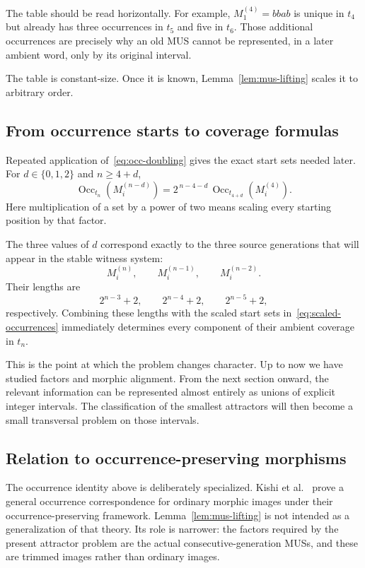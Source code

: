 \documentclass[11pt,a4paper]{article}
\theoremstyle{definition}\newtheorem{definition}[theorem]{Definition}
\theoremstyle{remark}\newtheorem{remark}[theorem]{Remark}
\newcommand{\Occ}{\operatorname{Occ}}
\begin{document}
The table should be read horizontally. For example, $M_1^{(4)}=bbab$ is unique in $t_4$ but already has three occurrences in $t_5$ and five in $t_6$. Those additional occurrences are precisely why an old MUS cannot be represented, in a later ambient word, only by its original interval.

The table is constant-size. Once it is known, Lemma~\ref{lem:mus-lifting} scales it to arbitrary order.

\subsection{From occurrence starts to coverage formulas}
\label{subsec:from-starts-to-coverages}

Repeated application of~\eqref{eq:occ-doubling} gives the exact start sets needed later. For $d\in\{0,1,2\}$ and $n\ge4+d$,
\begin{equation}
\Occ_{t_n}\!\left(M_i^{(n-d)}\right)
=
2^{\,n-4-d}\,
\Occ_{t_{4+d}}\!\left(M_i^{(4)}\right).
\label{eq:scaled-occurrences}
\end{equation}
Here multiplication of a set by a power of two means scaling every starting position by that factor.

The three values of $d$ correspond exactly to the three source generations that will appear in the stable witness system:
\[
M_i^{(n)},\qquad M_i^{(n-1)},\qquad M_i^{(n-2)}.
\]
Their lengths are
\[
2^{n-3}+2,\qquad 2^{n-4}+2,\qquad 2^{n-5}+2,
\]
respectively. Combining these lengths with the scaled start sets in~\eqref{eq:scaled-occurrences} immediately determines every component of their ambient coverage in $t_n$.

This is the point at which the problem changes character. Up to now we have studied factors and morphic alignment. From the next section onward, the relevant information can be represented almost entirely as unions of explicit integer intervals. The classification of the smallest attractors will then become a small transversal problem on those intervals.

\subsection{Relation to occurrence-preserving morphisms}
\label{subsec:relation-opm}

The occurrence identity above is deliberately specialized. Kishi et al.~\cite{Kishi2026} prove a general occurrence correspondence for ordinary morphic images under their occurrence-preserving framework. Lemma~\ref{lem:mus-lifting} is not intended as a generalization of that theory. Its role is narrower: the factors required by the present attractor problem are the actual consecutive-generation MUSs, and these are trimmed images rather than ordinary images.
\end{document}
